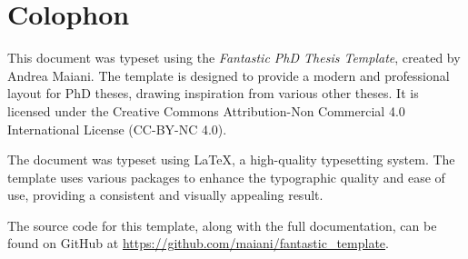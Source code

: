 \documentclass[../main]{subfiles}
\begin{document}
\chapter*{Colophon}
\label{ch:colophon}

This document was typeset using the \textit{Fantastic PhD Thesis Template}, created by Andrea Maiani. The template is designed to provide a modern and professional layout for PhD theses, drawing inspiration from various other theses. It is licensed under the Creative Commons Attribution-Non Commercial 4.0 International License (CC-BY-NC 4.0).

The document was typeset using \LaTeX{}, a high-quality typesetting system. The template uses various packages to enhance the typographic quality and ease of use, providing a consistent and visually appealing result.

The source code for this template, along with the full documentation, can be found on GitHub at \url{https://github.com/maiani/fantastic_template}.
\end{document}
